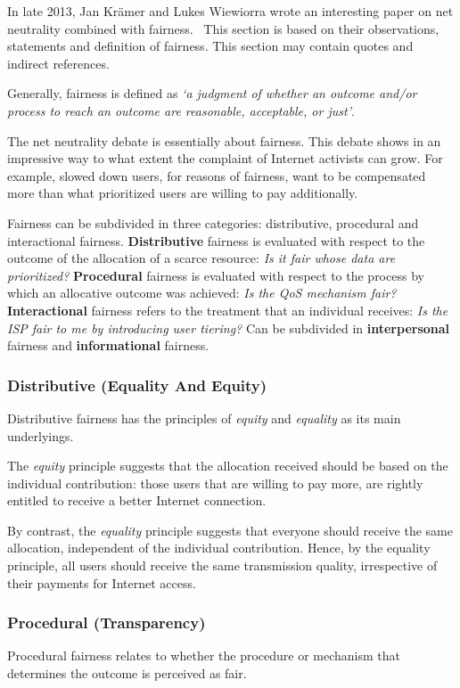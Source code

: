 
In late 2013, Jan Kr\"{a}mer and Lukes Wiewiorra wrote an interesting paper on net neutrality combined with fairness.~\cite{kramer2013fair} This section is based on their observations, statements and definition of fairness. This section may contain quotes and indirect references.

Generally, fairness is defined as \emph{`a judgment of whether an outcome and/or process to reach an outcome are reasonable, acceptable, or just'}.

The net neutrality debate is essentially about fairness. This debate shows in an impressive way to what extent the complaint of Internet activists can grow. For example, slowed down users, for reasons of fairness, want to be compensated more than what prioritized users are willing to pay additionally.

Fairness can be subdivided in three categories: distributive, procedural and interactional fairness. \textbf{Distributive} fairness is evaluated with respect to the outcome of the allocation of a scarce resource: \emph{Is it fair whose data are prioritized?} \textbf{Procedural} fairness is evaluated with respect to the process by which an allocative outcome was achieved: \emph{Is the QoS mechanism fair?} \textbf{Interactional} fairness refers to the treatment that an individual receives: \emph{Is the ISP fair to me by introducing user tiering?} Can be subdivided in \textbf{interpersonal} fairness and \textbf{informational} fairness.

\subsubsection{Distributive (Equality And Equity)}
Distributive fairness has the principles of \emph{equity} and \emph{equality} as its main underlyings.

The \emph{equity} principle suggests that the allocation received should be based on the individual contribution: those users that are willing to pay more, are rightly entitled to receive a better Internet connection.

By contrast, the \emph{equality} principle suggests that everyone should receive the same allocation, independent of the individual contribution. Hence, by the equality principle, all users should receive the same transmission quality, irrespective of their payments for Internet access.

\subsubsection{Procedural (Transparency)}
Procedural fairness relates to whether the procedure or mechanism that determines the outcome is perceived as fair.

